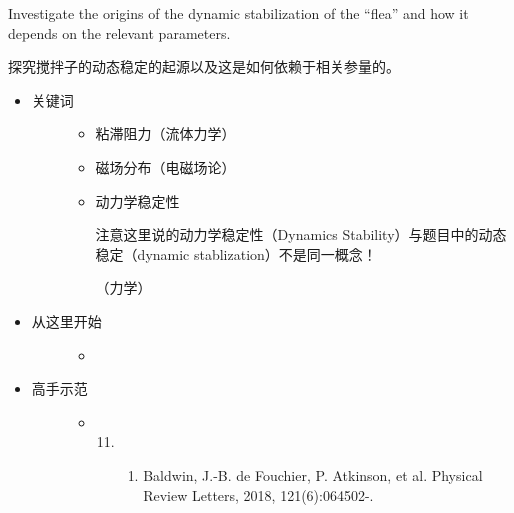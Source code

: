\documentclass[a4paper,10pt,english]{sphinxmanual}
\begin{document}
Investigate the origins of the dynamic stabilization of the “flea” and how it depends on the relevant parameters.

探究搅拌子的动态稳定的起源以及这是如何依赖于相关参量的。
\begin{itemize}
\item {} \begin{description}
\item[{关键词}] \leavevmode\begin{itemize}
\item {} 
粘滞阻力（流体力学）

\item {} 
磁场分布（电磁场论）

\item {} 
动力学稳定性 %
\begin{footnote}[6]\sphinxAtStartFootnote
注意这里说的动力学稳定性（Dynamics Stability）与题目中的动态稳定（dynamic stablization）不是同一概念！
%
\end{footnote} （力学）

\end{itemize}

\end{description}

\item {} \begin{description}
\item[{从这里开始}] \leavevmode\begin{itemize}
\item {} 

\end{itemize}

\end{description}

\item {} \begin{description}
\item[{高手示范}] \leavevmode\begin{itemize}
\item {} \begin{enumerate}
\setcounter{enumi}{10}
\item {} \begin{enumerate}
\item {} 
Baldwin, J.-B. de Fouchier, P. Atkinson, et al.  Physical Review Letters, 2018, 121(6):064502-.


\end{enumerate}
\end{enumerate}
\end{itemize}
\end{description}
\end{itemize}
\end{document}
